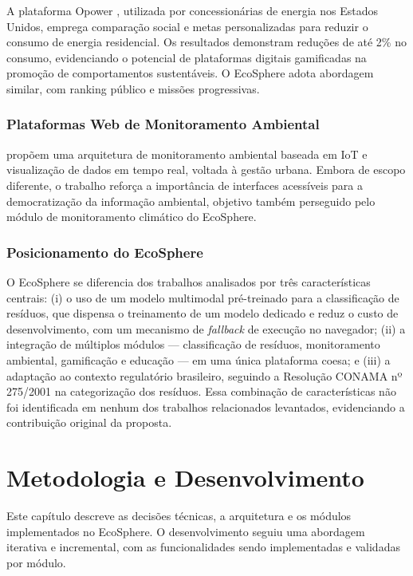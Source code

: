 \documentclass[
	12pt,
	openright,
	oneside,
	a4paper,
	chapter=TITLE,
	section=TITLE,
	subsection=TITLE,
	subsubsection=TITLE,
	english,
	brazil
	]{abntex2}
\begin{document}
A plataforma Opower \cite{ALCOTT2008}, utilizada por concessionárias de energia nos Estados Unidos, emprega comparação social e metas personalizadas para reduzir o consumo de energia residencial. Os resultados demonstram reduções de até 2\% no consumo, evidenciando o potencial de plataformas digitais gamificadas na promoção de comportamentos sustentáveis. O EcoSphere adota abordagem similar, com ranking público e missões progressivas.

\subsection{Plataformas Web de Monitoramento Ambiental}

 propõem uma arquitetura de monitoramento ambiental baseada em IoT e visualização de dados em tempo real, voltada à gestão urbana. Embora de escopo diferente, o trabalho reforça a importância de interfaces acessíveis para a democratização da informação ambiental, objetivo também perseguido pelo módulo de monitoramento climático do EcoSphere.

\subsection{Posicionamento do EcoSphere}

O EcoSphere se diferencia dos trabalhos analisados por três características centrais: (i) o uso de um modelo multimodal pré-treinado para a classificação de resíduos, que dispensa o treinamento de um modelo dedicado e reduz o custo de desenvolvimento, com um mecanismo de \textit{fallback} de execução no navegador; (ii) a integração de múltiplos módulos — classificação de resíduos, monitoramento ambiental, gamificação e educação — em uma única plataforma coesa; e (iii) a adaptação ao contexto regulatório brasileiro, seguindo a Resolução CONAMA nº 275/2001 na categorização dos resíduos. Essa combinação de características não foi identificada em nenhum dos trabalhos relacionados levantados, evidenciando a contribuição original da proposta.

\chapter{Metodologia e Desenvolvimento}

Este capítulo descreve as decisões técnicas, a arquitetura e os módulos implementados no EcoSphere. O desenvolvimento seguiu uma abordagem iterativa e incremental, com as funcionalidades sendo implementadas e validadas por módulo.
\end{document}
